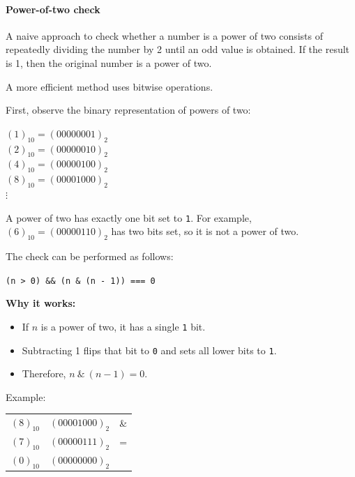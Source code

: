 \documentclass{scrbook}
\begin{document}
\paragraph{Power-of-two check}

A naive approach to check whether a number is a power of two consists of repeatedly dividing the number by 2 until an odd value is obtained. If the result is 1, then the original number is a power of two.

A more efficient method uses bitwise operations.

First, observe the binary representation of powers of two:

\begin{center}
    $(1)_{10} = (00000001)_{2}$\\
    $(2)_{10} = (00000010)_{2}$\\
    $(4)_{10} = (00000100)_{2}$\\
    $(8)_{10} = (00001000)_{2}$\\
    $\vdots$
\end{center}

A power of two has exactly one bit set to \texttt{1}. For example, $(6)_{10} = (00000110)_{2}$ has two bits set, so it is not a power of two.

The check can be performed as follows:

\begin{center}
    \texttt{(n > 0) \&\& (n \& (n - 1)) === 0}
\end{center}

\textbf{Why it works:}

\begin{itemize}
    \item If $n$ is a power of two, it has a single \texttt{1} bit.
    \item Subtracting 1 flips that bit to \texttt{0} and sets all lower bits to \texttt{1}.
    \item Therefore, $n ~\&~ (n - 1) = 0$.
\end{itemize}

Example:

\begin{center}
    \begin{tabular}{c c c}
        $(8)_{10}$ & $(00001000)_{2}$ & \& \\
        $(7)_{10}$ & $(00000111)_{2}$ & = \\ \hline
        $(0)_{10}$ & $(00000000)_{2}$ &
    \end{tabular}
\end{center}
\end{document}
